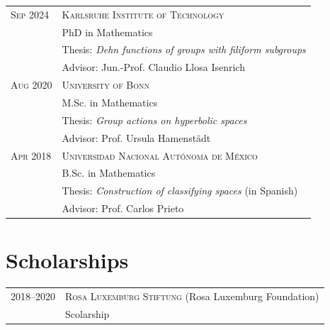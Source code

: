 \documentclass[a4paper,10pt]{article} %
\begin{document}
\begin{longtable}{>{\raggedleft\arraybackslash}p{4cm}p{10cm}}
\textsc{Sep} 2024 & \textsc{Karlsruhe Institute of Technology} \vspace{0.3em} \\
& PhD in Mathematics\\%
& \quad Thesis: \emph{Dehn functions of groups with filiform subgroups}\\ 
& \quad Advisor: Jun.-Prof. Claudio Llosa Isenrich \vspace{0.5em}\\

\textsc{Aug} 2020& \textsc{University of Bonn} \vspace{0.3em}\\
&M.Sc. in Mathematics\\%
& \quad Thesis: \emph{Group actions on hyperbolic spaces}\\ 
& \quad Advisor: Prof. Ursula Hamenstädt \vspace{0.5em}\\

\textsc{Apr} 2018& \textsc{Universidad Nacional Autónoma de México} \vspace{0.3em}\\ 
& B.Sc. in Mathematics\\%
& \quad Thesis: \emph{Construction of classifying spaces} (in Spanish)\\ 
& \quad Advisor: Prof. Carlos Prieto\\
\end{longtable}


\section{Scholarships}

\begin{longtable}{>{\raggedleft\arraybackslash}p{4cm}p{10cm}}

\textsc{2018--2020} & \textsc{Rosa Luxemburg Stiftung} \small (Rosa Luxemburg Foundation)\vspace{0.2em}\\
& Scolarship
\end{longtable}
\end{document}
